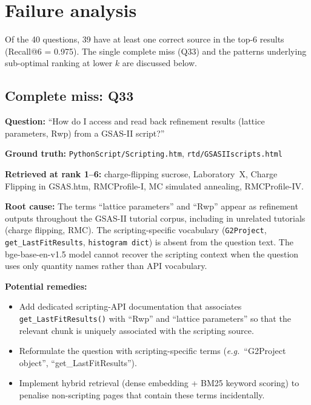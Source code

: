 \documentclass[12pt,a4paper]{article}
\begin{document}
\section{Failure analysis}
\label{sec:failure}

Of the 40 questions, 39 have at least one correct source in the top-6
results (Recall@6 = 0.975).
The single complete miss (Q33) and the patterns underlying
sub-optimal ranking at lower $k$ are discussed below.

\subsection{Complete miss: Q33}

\noindent\textbf{Question:} ``How do I access and read back refinement results
(lattice parameters, Rwp) from a GSAS-II script?''

\noindent\textbf{Ground truth:} \texttt{PythonScript/Scripting.htm},
\texttt{rtd/GSASIIscripts.html}

\noindent\textbf{Retrieved at rank 1--6:}
charge-flipping sucrose, Laboratory~X, Charge Flipping in GSAS.htm,
RMCProfile-I, MC simulated annealing, RMCProfile-IV.

\noindent\textbf{Root cause:}
The terms ``lattice parameters'' and ``Rwp'' appear as refinement outputs
throughout the GSAS-II tutorial corpus, including in unrelated tutorials
(charge flipping, RMC).
The scripting-specific vocabulary (\texttt{G2Project}, \texttt{get\_LastFitResults},
\texttt{histogram dict}) is absent from the question text.
The bge-base-en-v1.5 model cannot recover the scripting context
when the question uses only quantity names rather than API vocabulary.

\noindent\textbf{Potential remedies:}
\begin{itemize}[leftmargin=*]
  \item Add dedicated scripting-API documentation that associates
        \texttt{get\_LastFitResults()} with ``Rwp'' and ``lattice parameters''
        so that the relevant chunk is uniquely associated with the scripting
        source.
  \item Reformulate the question with scripting-specific terms (\emph{e.g.}\
        ``G2Project object'', ``get\_LastFitResults'').
  \item Implement hybrid retrieval (dense embedding + BM25 keyword scoring)
        to penalise non-scripting pages that contain these terms incidentally.
\end{itemize}
\end{document}
